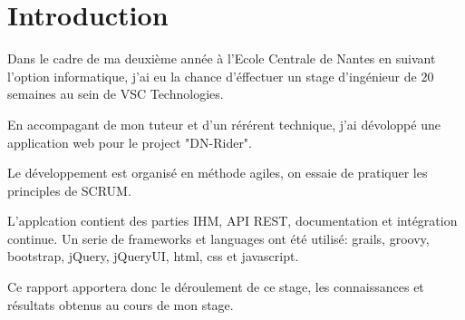 \chapter{Introduction}
\label{chap:Introduction}

Dans le cadre de ma deuxième année à l'Ecole Centrale de Nantes en suivant l'option informatique,
j'ai eu la chance d'éffectuer un stage d'ingénieur de 20 semaines au sein de VSC Technologies.

En accompagant de mon tuteur et d'un rérérent technique, j'ai dévoloppé une application web pour le project "DN-Rider".

Le développement est organisé en méthode agiles, on essaie de pratiquer les principles de SCRUM.

L'applcation contient des parties IHM, API REST, documentation et intégration continue.
Un serie de frameworks et languages ont été utilisé: grails, groovy, bootstrap, jQuery, jQueryUI, html, css et javascript.

Ce rapport apportera donc le déroulement de ce stage, les connaissances et résultats obtenus au cours de mon stage.
